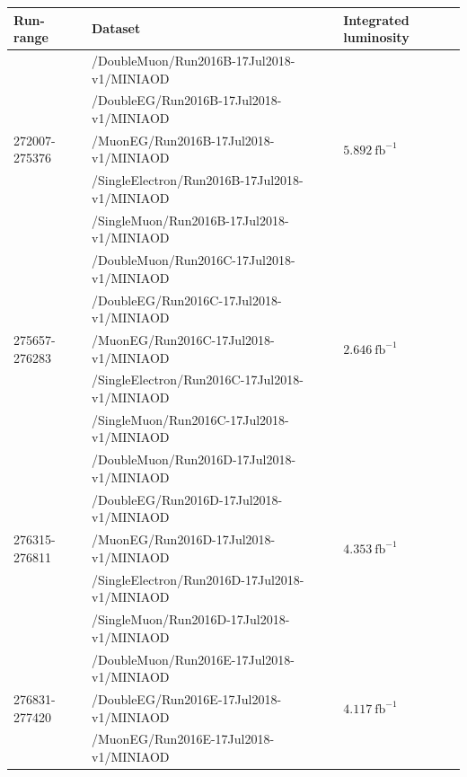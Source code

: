 \begin{table}[h]
        \tiny
	\centering
	\begin{tabular}{|l|l|l|} 
		\hline %
		\hline %
		Run-range & Dataset & Integrated luminosity \\
		\hline %
		\hline %
		\multirow{5}{*}{272007-275376} & /DoubleMuon/Run2016B-17Jul2018-v1/MINIAOD &  \multirow{5}{*}{$5.892\ \text{fb}^{-1}$} \\ 
		& /DoubleEG/Run2016B-17Jul2018-v1/MINIAOD &  \\ 
		& /MuonEG/Run2016B-17Jul2018-v1/MINIAOD &  \\ 
		& /SingleElectron/Run2016B-17Jul2018-v1/MINIAOD &  \\ 
		& /SingleMuon/Run2016B-17Jul2018-v1/MINIAOD &  \\ 
		\hline
		\multirow{5}{*}{275657-276283} & /DoubleMuon/Run2016C-17Jul2018-v1/MINIAOD &  \multirow{5}{*}{$2.646\ \text{fb}^{-1}$}  \\ 
		& /DoubleEG/Run2016C-17Jul2018-v1/MINIAOD &  \\ 
		& /MuonEG/Run2016C-17Jul2018-v1/MINIAOD &  \\ 
		& /SingleElectron/Run2016C-17Jul2018-v1/MINIAOD &  \\ 
		& /SingleMuon/Run2016C-17Jul2018-v1/MINIAOD &  \\ 
		\hline
		\multirow{5}{*}{276315-276811} & /DoubleMuon/Run2016D-17Jul2018-v1/MINIAOD &  \multirow{5}{*}{$4.353\ \text{fb}^{-1}$} \\ 
		& /DoubleEG/Run2016D-17Jul2018-v1/MINIAOD &  \\ 
		& /MuonEG/Run2016D-17Jul2018-v1/MINIAOD &  \\ 
		& /SingleElectron/Run2016D-17Jul2018-v1/MINIAOD &  \\ 
		& /SingleMuon/Run2016D-17Jul2018-v1/MINIAOD &  \\ 
		\hline
		\multirow{5}{*}{276831-277420} & /DoubleMuon/Run2016E-17Jul2018-v1/MINIAOD &  \multirow{5}{*}{$4.117\ \text{fb}^{-1}$} \\ 
		& /DoubleEG/Run2016E-17Jul2018-v1/MINIAOD &  \\ 
		& /MuonEG/Run2016E-17Jul2018-v1/MINIAOD &  \\ 

\end{tabular}
\end{table}
